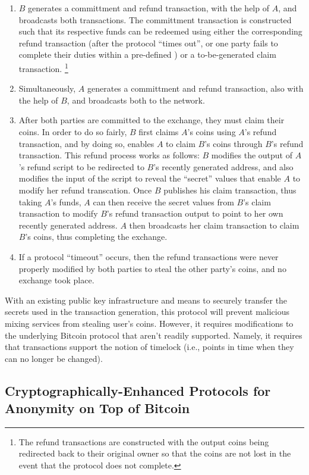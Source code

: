 \begin{enumerate}
	\item $B$ generates a committment and refund transaction, with the help of $A$, and broadcasts both transactions. The committment transaction is constructed such that its respective funds can be redeemed using either the corresponding refund transaction (after the protocol ``times out'', or one party fails to complete their duties within a pre-defined ) or a to-be-generated claim transaction. \footnote{The refund transactions are constructed with the output coins being redirected back to their original owner so that the coins are not lost in the event that the protocol does not complete.}
	\item Simultaneously, $A$ generates a committment and refund transaction, also with the help of $B$, and broadcasts both to the network. 
	\item After both parties are committed to the exchange, they must claim their coins. In order to do so fairly, $B$ first claims $A$'s coins using $A$'s refund transaction, and by doing so, enables $A$ to claim $B$'s coins through $B$'s refund transaction. This refund process works as follows: $B$ modifies the output of $A$'s refund script to be redirected to $B$'s recently generated address, and also modifies the input of the script to reveal the ``secret'' values that enable $A$ to modify her refund transcation. Once $B$ publishes his claim transaction, thus taking $A$'s funds, $A$ can then receive the secret values from $B$'s claim transaction to modify $B$'s refund transaction output to point to her own recently generated address. $A$ then broadcasts her claim transaction to claim $B$'s coins, thus completing the exchange.
	\item If a protocol ``timeout'' occurs, then the refund transactions were never properly modified by both parties to steal the other party's coins, and no exchange took place. 
\end{enumerate}
With an existing public key infrastructure and means to securely transfer the secrets used in the transaction generation, this protocol will prevent malicious mixing services from stealing user's coins. However, it requires modifications to the underlying Bitcoin protocol that aren't readily supported. Namely, it requires that transactions support the notion of timelock (i.e., points in time when they can no longer be changed). 


\subsection{Cryptographically-Enhanced Protocols for Anonymity on Top of Bitcoin}

